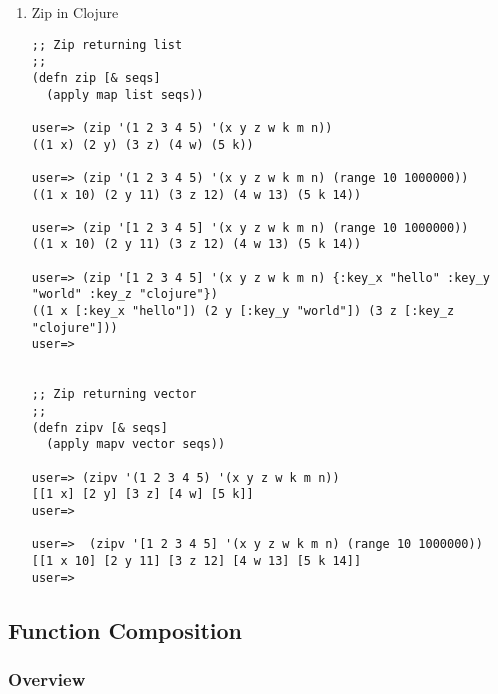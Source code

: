 \documentclass[11pt]{article}
\begin{document}
\begin{enumerate}
\begin{verbatim}
(define (zip . lists)
   (apply map  vector lists))

> (zip '(1 2 3 4) '("a" "b" "c" "d"))       
(#(1 "a") #(2 "b") #(3 "c") #(4 "d"))
> 

;; Or 

(define (zip . lists)
   (apply map  list lists))

> (zip '(1 2 3 4) '("a" "b" "c" "d"))
((1 "a") (2 "b") (3 "c") (4 "d"))
> 

> (zip '(1 2 3 4) '("a" "b" "c" "d") '(89 199 100 43))
((1 "a" 89) (2 "b" 199) (3 "c" 100) (4 "d" 43))
>
\end{verbatim}

\item Zip in Clojure
\label{sec-1-10-4-5}

\begin{verbatim}
;; Zip returning list
;;
(defn zip [& seqs] 
  (apply map list seqs))

user=> (zip '(1 2 3 4 5) '(x y z w k m n))
((1 x) (2 y) (3 z) (4 w) (5 k))

user=> (zip '(1 2 3 4 5) '(x y z w k m n) (range 10 1000000))
((1 x 10) (2 y 11) (3 z 12) (4 w 13) (5 k 14))

user=> (zip '[1 2 3 4 5] '(x y z w k m n) (range 10 1000000))
((1 x 10) (2 y 11) (3 z 12) (4 w 13) (5 k 14))

user=> (zip '[1 2 3 4 5] '(x y z w k m n) {:key_x "hello" :key_y "world" :key_z "clojure"})
((1 x [:key_x "hello"]) (2 y [:key_y "world"]) (3 z [:key_z "clojure"]))
user=> 


;; Zip returning vector 
;;
(defn zipv [& seqs] 
  (apply mapv vector seqs))

user=> (zipv '(1 2 3 4 5) '(x y z w k m n))
[[1 x] [2 y] [3 z] [4 w] [5 k]]
user=> 

user=>  (zipv '[1 2 3 4 5] '(x y z w k m n) (range 10 1000000))
[[1 x 10] [2 y 11] [3 z 12] [4 w 13] [5 k 14]]
user=>
\end{verbatim}
\end{enumerate}

\subsection{Function Composition}
\label{sec-1-11}
\subsubsection{Overview}
\label{sec-1-11-1}
\end{document}
